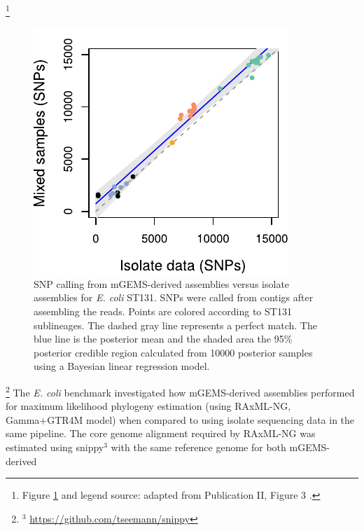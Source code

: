 \documentclass[officiallayout]{tktla}
\let\svthefootnote\thefootnote
\begin{document}
\noindent\let\thefootnote\relax\footnote{Figure \ref{fig:mgems-ecoli-snps} and legend source: adapted from Publication II, Figure 3 \citep{maklin_bacterial_2021}.}
\addtocounter{footnote}{-1}\let\thefootnote\svthefootnote
\begin{figure}[!b]
    \centering
    \includegraphics[height=0.33\textheight,width=\textwidth,keepaspectratio]{img/reproduced/MGen2021_mGEMS_Figure_3a.pdf}
    \caption{SNP calling from mGEMS-derived assemblies versus isolate
      assemblies for \textit{E. coli} ST131. SNPs were called from
      contigs after assembling the reads. Points are colored according
      to ST131 sublineages. The dashed gray line represents a perfect
      match. The blue line is the posterior mean and the shaded area
      the 95\% posterior credible region calculated from 10000
      posterior samples using a Bayesian linear regression model.}
  \label{fig:mgems-ecoli-snps}
\end{figure}
\noindent\let\thefootnote\relax\footnote{$^{3}$ \url{https://github.com/tseemann/snippy}}
The \textit{E. coli} benchmark investigated how mGEMS-derived
assemblies performed for maximum likelihood phylogeny estimation
(using RAxML-NG, Gamma+GTR4M model) \citep{kozlov2019raxml} when
compared to using isolate sequencing data in the same pipeline. The
core genome alignment required by RAxML-NG was estimated using
snippy$^{3}$ with the same reference genome for both mGEMS-derived
\end{document}
